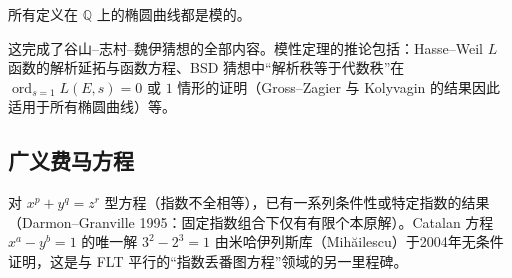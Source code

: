 \begin{theorem}
    所有定义在 $\mathbb{Q}$ 上的椭圆曲线都是模的。
\end{theorem}

这完成了谷山--志村--魏伊猜想的全部内容。模性定理的推论包括：Hasse--Weil $L$ 函数的解析延拓与函数方程、BSD 猜想中“解析秩等于代数秩”在 $\operatorname{ord}_{s=1} L(E,s) = 0$ 或 $1$ 情形的证明（Gross--Zagier 与 Kolyvagin 的结果因此适用于所有椭圆曲线）等。

\subsection{广义费马方程}

对 $x^p + y^q = z^r$ 型方程（指数不全相等），已有一系列条件性或特定指数的结果（Darmon--Granville 1995：固定指数组合下仅有有限个本原解\cite{darmon1995equations}）。Catalan 方程 $x^a - y^b = 1$ 的唯一解 $3^2 - 2^3 = 1$ 由米哈伊列斯库（Mih\u{a}ilescu）于2004年无条件证明\cite{mihailescu2004catalan}，这是与 FLT 平行的“指数丢番图方程”领域的另一里程碑。

